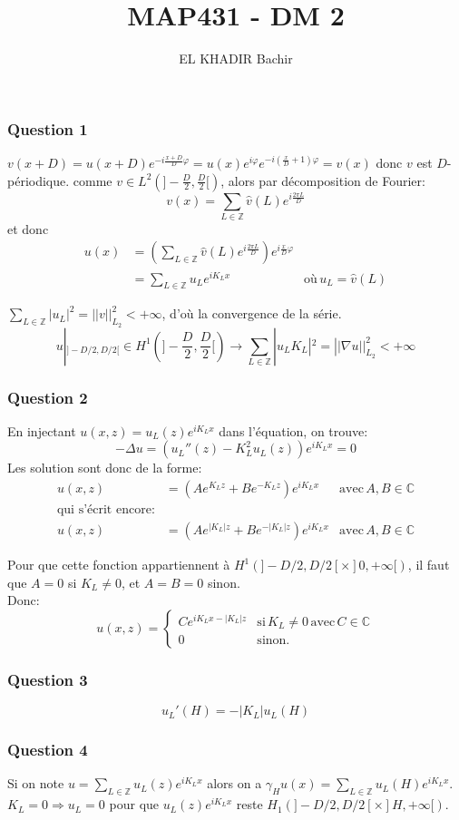 \documentclass{article}
\newcommand{\Q}[1]{\subsubsection*{Question #1}}
\begin{document}
\title{MAP431 - DM 2}
\author{EL KHADIR Bachir}


\maketitle

\Q{1}

$v(x+D) = u(x+D) e^{-i\frac{x+D}{D} \varphi} = u(x)e^{i \varphi} e^{-i(\frac{x}{D}+1) \varphi} = v(x)$ donc $v$ est $D$-périodique.
comme $v \in L^2( ] -\frac{D}{2},\frac{D}{2} [) $, alors par décomposition de Fourier:
$$v(x) = \sum_{L \in \mathbb{Z}} \hat v(L) e^{i \frac{2\pi L}{D} }$$
et donc
\begin{align*}
u(x) &= \left( \sum_{L \in \mathbb{Z}} \hat v(L) e^{i \frac{2\pi L}{D} } \right) e^{i\frac{x}{D}\varphi} \\
&= \sum_{L \in \mathbb{Z}} u_L e^{i K_L x} & \text{où} \, u_L = \hat v(L)
\end{align*}

$\sum_{L \in \mathbb{Z}} |u_L| ^2 = || v ||_{L_2}^2 < + \infty$, d'où la convergence de la série.
$$u|_{]-D/2,D/2[} \in H^1(]-\frac{D}{2}, \frac{D}{2}[) \rightarrow \sum_{L \in \mathbb{Z}} |u_L K_L|^2 = || \nabla u ||_{L_2}^2 < +\infty$$


\Q{2}
En injectant $u(x, z) = u_L(z) e^{i K_L x}$ dans l'équation, on trouve:
$$ -\Delta u = (u_L''(z) - K_L^2 u_L(z)) e^{iK_L x} = 0$$
Les solution sont donc de la forme:
\begin{align*}
u(x, z) &= (A e^{K_L z} + B e^{-K_L z}) e^{i K_L x} & \text{avec} \, A, B \in \mathbb{C} \\
\text{qui s'écrit encore:} \\
u(x, z) &= (A e^{|K_L| z} + B e^{-|K_L| z}) e^{i K_L x} & \text{avec} \, A, B \in \mathbb{C}
\end{align*}

Pour que cette fonction appartiennent à $H^1(]-D/2, D/2[ \times ]0, +\infty[ )$, il faut que $A = 0$ si $K_L \neq 0$, et $A = B = 0$ sinon.\\
Donc:
$$u(x, z) =   \left\{
   \begin{array}{ll}
       C e^{i K_L x - |K_L| z } & \mbox{si} \, K_L \neq 0 \, \mbox{avec} \, C \in \mathbb{C} \\
       0 & \mbox{sinon.}
   \end{array}
\right.
$$


\Q{3}
$$u_L'(H) = - |K_L| u_L(H)$$

\Q{4}
Si on note $u = \sum_{L \in \mathbb{Z}} u_L(z) e^{iK_Lx}$ alors on a $\gamma_H u (x) = \sum_{L \in \mathbb{Z}} u_L(H) e^{iK_Lx}$.\\
$K_L = 0  \Rightarrow u_L = 0 $ pour que $u_L(z) e^{iK_Lx}$ reste $H_1(]-D/2,D/2[ \times ]H, +\infty[)$.\\
\end{document}
